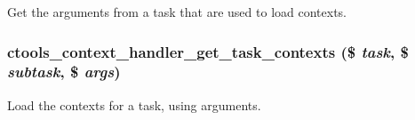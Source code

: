\label{context-task-handler_8inc_a4179b2d1d2e10e075410d7697605350d}
Get the arguments from a task that are used to load contexts. \hypertarget{context-task-handler_8inc_a3c1fa47c9e759dccffdb132a41d7f40f}{
\subsubsection[{ctools\_\-context\_\-handler\_\-get\_\-task\_\-contexts}]{\setlength{\rightskip}{0pt plus 5cm}ctools\_\-context\_\-handler\_\-get\_\-task\_\-contexts (\$ {\em task}, \/  \$ {\em subtask}, \/  \$ {\em args})}}
\label{context-task-handler_8inc_a3c1fa47c9e759dccffdb132a41d7f40f}
Load the contexts for a task, using arguments.

